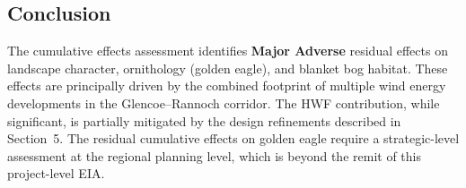\subsection{Conclusion}
The cumulative effects assessment identifies \textbf{Major Adverse} residual effects on landscape character, ornithology (golden eagle), and blanket bog habitat. These effects are principally driven by the combined footprint of multiple wind energy developments in the Glencoe--Rannoch corridor. The HWF contribution, while significant, is partially mitigated by the design refinements described in Section~5. The residual cumulative effects on golden eagle require a strategic-level assessment at the regional planning level, which is beyond the remit of this project-level EIA.

